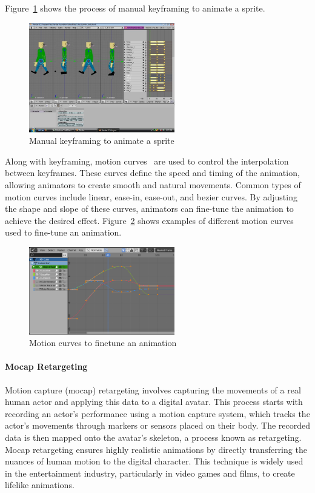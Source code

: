 \documentclass[../../main.tex]{subfiles}
\begin{document}
Figure~\ref{fig:keyframing} shows the process of manual keyframing to animate a sprite.

\begin{figure} 
  \centering \includegraphics[width = 2.5in]{chapters/background_work/images/keyframing.png} 
  \caption{Manual keyframing to animate a sprite} 
  \label{fig:keyframing} 
\end{figure}

Along with keyframing, motion curves~\cite{10.1145/218380.218422} are used to control the interpolation between keyframes. These curves define the speed and timing of the animation, allowing animators to create smooth and natural movements. Common types of motion curves include linear, ease-in, ease-out, and bezier curves. By adjusting the shape and slope of these curves, animators can fine-tune the animation to achieve the desired effect. Figure~\ref{fig:motion_curves} shows examples of different motion curves used to fine-tune an animation.

\begin{figure} 
  \centering \includegraphics[width = 2.5in]{chapters/background_work/images/motion_curves.png} 
  \caption{Motion curves to finetune an animation} 
  \label{fig:motion_curves} 
\end{figure}

\paragraph{Mocap Retargeting}
\label{ch:background_work:sign_language_synthesis:3d_techniques:avatar_animation:mocap_retargeting}

Motion capture (mocap) retargeting involves capturing the movements of a real human actor and applying this data to a digital avatar. This process starts with recording an actor’s performance using a motion capture system, which tracks the actor’s movements through markers or sensors placed on their body. The recorded data is then mapped onto the avatar’s skeleton, a process known as retargeting. Mocap retargeting ensures highly realistic animations by directly transferring the nuances of human motion to the digital character. This technique is widely used in the entertainment industry, particularly in video games and films, to create lifelike animations.
\end{document}
